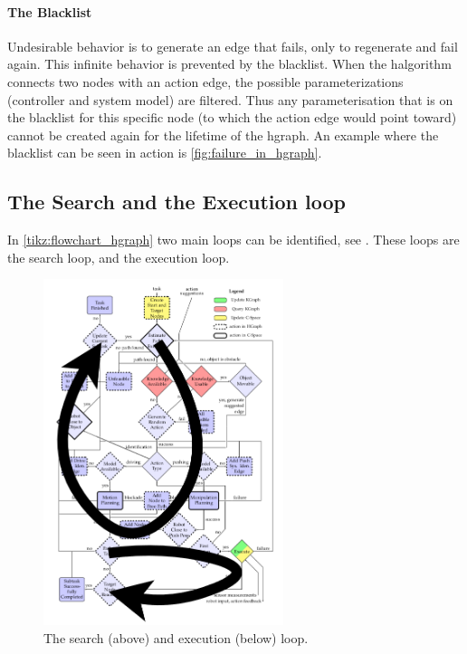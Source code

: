 \paragraph{The Blacklist}%
Undesirable behavior is to generate an edge that fails, only to regenerate and fail again. This infinite behavior is prevented by the blacklist. When the \ac{halgorithm} connects two nodes with an action edge, the possible parameterizations (controller and system model) are filtered. Thus any parameterisation that is on the blacklist for this specific node (to which the action edge would point toward) cannot be created again for the lifetime of the \ac{hgraph}. An example where the blacklist can be seen in action is \cref{fig:failure_in_hgraph}.\bs



\subsection{The Search and the Execution loop}%
\label{subsec:two_loops}
In \cref{tikz:flowchart_hgraph} two main loops can be identified, see . These loops are the search loop, and the execution loop.\bs

\begin{figure}[H]
    \centering
    \includegraphics[width=7cm]{figures/two_loops_identified}
    \caption{The search (above) and execution (below) loop.}%
    \label{fig:two_loops_identified}
\end{figure}


